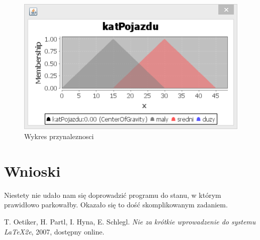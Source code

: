 \documentclass{classrep}
\begin{document}
\begin{figure}[ht]
\centering
			\includegraphics[scale=1.00]{pictures/Obraz09.png}
	\caption{Wykres przynaleznosci}
	\label{fig:Wykres przynaleznosci}
\end{figure}

\clearpage

\section{Wnioski}
  Niestety nie udało nam się doprowadzić programu do stanu, w którym prawidłowo parkowałby. Okazało się to dość skomplikowanym zadaniem.


\begin{thebibliography}{0}
   T. Oetiker, H. Partl, I. Hyna, E. Schlegl.
    \textsl{Nie za krótkie wprowadzenie do systemu \LaTeX2e}, 2007, dostępny
    online.
\end{thebibliography}
\end{document}
